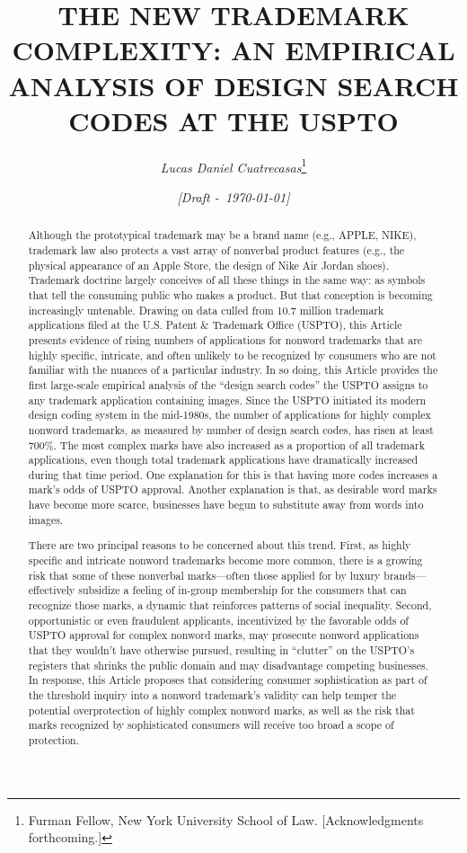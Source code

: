 \documentclass[letterpaper, 11pt, oneside]{article}
\title{\Large{\uppercase{The New Trademark Complexity: An Empirical Analysis of Design Search Codes at the USPTO}}}
\author{\large\textit{Lucas Daniel Cuatrecasas}\thanks{Furman Fellow, New York University School of Law. [Acknowledgments forthcoming.]}}
\date{\textit{\small [Draft -\ \today]}}
\begin{document}
\maketitle\thispagestyle{firstpage}

\begin{abstract}

\begin{itshape}

Although the prototypical trademark may be a brand name (e.g., APPLE, NIKE), trademark law also protects a vast array of nonverbal product features (e.g., the physical appearance of an Apple Store, the design of Nike Air Jordan shoes). Trademark doctrine largely conceives of all these things in the same way: as symbols that tell the consuming public who makes a product. But that conception is becoming increasingly untenable. Drawing on data culled from 10.7 million trademark applications filed at the U.S. Patent \& Trademark Office (USPTO), this Article presents evidence of rising numbers of applications for nonword trademarks that are highly specific, intricate, and often unlikely to be recognized by consumers who are not familiar with the nuances of a particular industry. In so doing, this Article provides the first large-scale empirical analysis of the ``design search codes'' the USPTO assigns to any trademark application containing images. Since the USPTO initiated its modern design coding system in the mid-1980s, the number of applications for highly complex nonword trademarks, as measured by number of design search codes, has risen at least 700\%. The most complex marks have also increased as a proportion of all trademark applications, even though total trademark applications have dramatically increased during that time period. One explanation for this is that having more codes increases a mark's odds of USPTO approval. Another explanation is that, as desirable word marks have become more scarce, businesses have begun to substitute away from words into images.

There are two principal reasons to be concerned about this trend. First, as highly specific and intricate nonword trademarks become more common, there is a growing risk that some of these nonverbal marks—often those applied for by luxury brands—effectively subsidize a feeling of in-group membership for the consumers that can recognize those marks, a dynamic that reinforces patterns of social inequality. Second, opportunistic or even fraudulent applicants, incentivized by the favorable odds of USPTO approval for complex nonword marks, may prosecute nonword applications that they wouldn't have otherwise pursued, resulting in ``clutter'' on the USPTO's registers that shrinks the public domain and may disadvantage competing businesses. In response, this Article proposes that considering consumer sophistication as part of the threshold inquiry into a nonword trademark's validity can help temper the potential overprotection of highly complex nonword marks, as well as the risk that marks recognized by sophisticated consumers will receive too broad a scope of protection.

\end{itshape}

\end{abstract}
\end{document}
